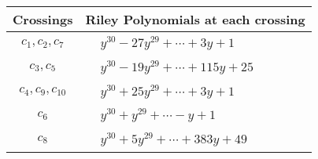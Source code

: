 \documentclass[1p]{elsarticle_modified}
\theoremstyle{definition}
\begin{document}
\begin{tabular}{m{50pt}|m{274pt}}
Crossings & \hspace{64pt}Riley Polynomials at each crossing \\
\hline $$\begin{aligned}c_{1},c_{2},c_{7}\end{aligned}$$&$\begin{aligned}
&y^{30}-27 y^{29}+\cdots+3 y+1
\end{aligned}$\\
\hline $$\begin{aligned}c_{3},c_{5}\end{aligned}$$&$\begin{aligned}
&y^{30}-19 y^{29}+\cdots+115 y+25
\end{aligned}$\\
\hline $$\begin{aligned}c_{4},c_{9},c_{10}\end{aligned}$$&$\begin{aligned}
&y^{30}+25 y^{29}+\cdots+3 y+1
\end{aligned}$\\
\hline $$\begin{aligned}c_{6}\end{aligned}$$&$\begin{aligned}
&y^{30}+y^{29}+\cdots- y+1
\end{aligned}$\\
\hline $$\begin{aligned}c_{8}\end{aligned}$$&$\begin{aligned}
&y^{30}+5 y^{29}+\cdots+383 y+49
\end{aligned}$\\
\hline
\end{tabular}
\vskip 2pc
\end{document}
